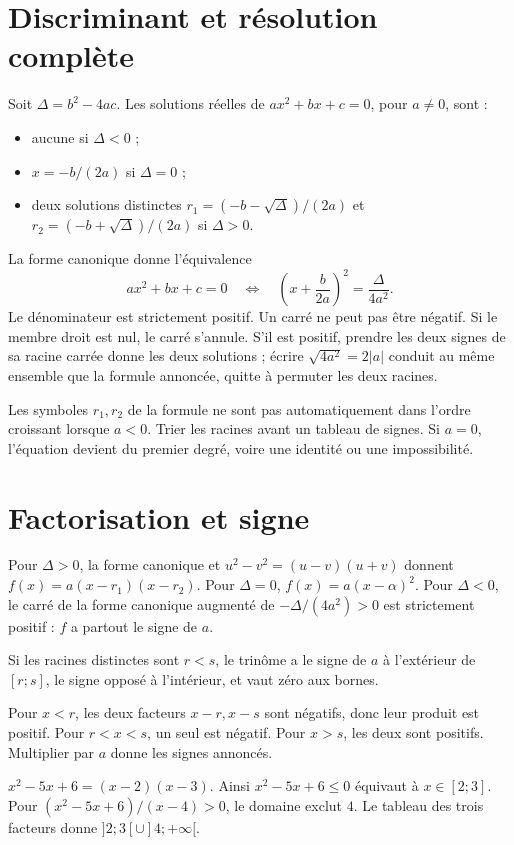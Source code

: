 \documentclass[../cours_1re.tex]{subfiles}
\begin{document}
\section{Discriminant et résolution complète}
\begin{theoreme}
Soit $\Delta=b^2-4ac$. Les solutions réelles de $ax^2+bx+c=0$, pour $a\ne0$, sont :
\begin{itemize}
\item aucune si $\Delta<0$ ;
\item $x=-b/(2a)$ si $\Delta=0$ ;
\item deux solutions distinctes $r_1=(-b-\sqrt\Delta)/(2a)$ et $r_2=(-b+\sqrt\Delta)/(2a)$ si $\Delta>0$.
\end{itemize}
\end{theoreme}
\begin{demonstration}
La forme canonique donne l'équivalence
\[
ax^2+bx+c=0
\quad\Longleftrightarrow\quad
\left(x+\frac b{2a}\right)^2=\frac{\Delta}{4a^2}.
\]
Le dénominateur est strictement positif. Un carré ne peut pas être négatif. Si le membre droit est nul, le carré s'annule. S'il est positif, prendre les deux signes de sa racine carrée donne les deux solutions ; écrire $\sqrt{4a^2}=2|a|$ conduit au même ensemble que la formule annoncée, quitte à permuter les deux racines.
\end{demonstration}
\begin{attention}
Les symboles $r_1,r_2$ de la formule ne sont pas automatiquement dans l'ordre croissant lorsque $a<0$. Trier les racines avant un tableau de signes. Si $a=0$, l'équation devient du premier degré, voire une identité ou une impossibilité.
\end{attention}
\section{Factorisation et signe}
Pour $\Delta>0$, la forme canonique et $u^2-v^2=(u-v)(u+v)$ donnent
$f(x)=a(x-r_1)(x-r_2)$.
Pour $\Delta=0$, $f(x)=a(x-\alpha)^2$.
Pour $\Delta<0$, le carré de la forme canonique augmenté de $-\Delta/(4a^2)>0$ est strictement positif : $f$ a partout le signe de $a$.
\begin{propriete}
Si les racines distinctes sont $r<s$, le trinôme a le signe de $a$ à l'extérieur de $[r;s]$, le signe opposé à l'intérieur, et vaut zéro aux bornes.
\end{propriete}
\begin{demonstration}
Pour $x<r$, les deux facteurs $x-r,x-s$ sont négatifs, donc leur produit est positif. Pour $r<x<s$, un seul est négatif. Pour $x>s$, les deux sont positifs. Multiplier par $a$ donne les signes annoncés.
\end{demonstration}
\begin{exemple}
$x^2-5x+6=(x-2)(x-3)$. Ainsi $x^2-5x+6\le0$ équivaut à $x\in[2;3]$.
Pour $(x^2-5x+6)/(x-4)>0$, le domaine exclut $4$. Le tableau des trois facteurs donne $]2;3[\cup]4;+\infty[$.
\end{exemple}
\end{document}
